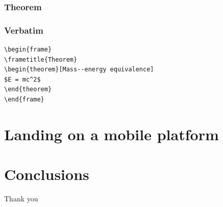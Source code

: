 \documentclass[xcolor=dvipsnames]{beamer}
\begin{document}
\begin{frame}
\tableofcontents[sectionstyle=show,square,currentsection]
\end{frame}

\begin{frame}
\frametitle{Theorem}

\end{frame}


\begin{frame}[fragile] %
\frametitle{Verbatim}
\begin{example}
\begin{verbatim}
\begin{frame}
\frametitle{Theorem}
\begin{theorem}[Mass--energy equivalence]
$E = mc^2$
\end{theorem}
\end{frame}\end{verbatim}
\end{example}
\end{frame}


\section{Landing on a mobile platform}

\begin{frame}
\tableofcontents[sectionstyle=show,square,currentsection]
\end{frame}


\section{Conclusions}

\begin{frame}
\tableofcontents[sectionstyle=show,square,currentsection]
\end{frame}

\begin{frame}
\Huge{\centerline{Thank you}}
\end{frame}

\end{document}

